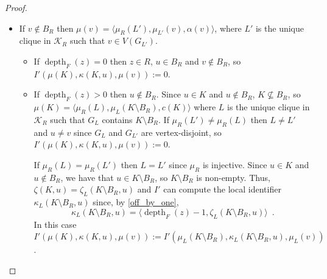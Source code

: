 \documentclass[twoside,leqno]{article}
\providecommand{\qedhere}{}
\let\eqref\cref
\DeclareMathOperator{\depth}{depth}
\begin{document}
\begin{proof}
\begin{itemize}
\begin{itemize}
      \item If $\depth_F(z)=0$ then $z\in R$ and $u\in B_R$.   There are now two possibilities that $I'$ can distinguish by looking at the number of parts of $\mu(K)$.
      \begin{itemize}
        \item If $\mu(K)$ has one part then $K\subseteq B_R$,  $\mu(K)=\langle \mu_R(K)\rangle$, and $\zeta(K,u)=\kappa_R(K,u)$.  Therefore, $I'(\mu(K),\kappa(K,u),\mu(v)):=I(\mu_R(K),\kappa_R(K,u),\mu_R(v))$.
        \item If $\mu(K)$ has three parts, then $K\not\subseteq B_R$, $\mu(K)=\langle \mu_R(L),\mu_L(K\setminus B_R),c(K)\rangle$, and  $\zeta(K,u)=\kappa_R(L,u)$, where $L$ is the unique clique in $\mathcal{K}_R$ such that $G_L$ contains $K\setminus B_R$.  Then $K\cap B_R=K\cap L$, so $u\in L$. Therefore, $I'(\mu(K),\kappa(K,u),\mu(v)):=I(\mu_R(L),\kappa_R(L,u),\mu_R(v))$.
      \end{itemize}
    \end{itemize}
    \item If $v\not\in B_R$ then $\mu(v)=\langle \mu_R(L'),\mu_{L'}(v),\alpha(v)\rangle$, where $L'$ is the unique clique in $\mathcal{K}_R$ such that $v\in V(G_{L'})$.
    \begin{itemize}
      \item If $\depth_F(z)=0$ then $z\in R$, $u\in B_R$ and $v\not\in B_R$, so $I'(\mu(K),\kappa(K,u),\mu(v)):=0$.

      \item If $\depth_F(z)>0$ then $u\not\in B_R$.  Since $u\in K$ and $u\not\in B_R$, $K\not\subseteq B_R$, so $\mu(K)=\langle \mu_R(L),\mu_{L}(K\setminus B_R),c(K)\rangle$ where $L$ is the unique clique in $\mathcal{K}_R$ such that $G_L$ contains $K\setminus B_R$.  If $\mu_R(L')\neq \mu_R(L)$ then $L\neq L'$ and $u\neq v$ since $G_{L}$ and $G_{L'}$ are vertex-disjoint, so $I'(\mu(K),\kappa(K,u),\mu(v)):=0$.

      If $\mu_R(L)=\mu_R(L')$ then $L=L'$ since $\mu_R$ is injective.
      Since $u\in K$ and $u\not\in B_R$, we have that $u\in K\setminus B_R$, so $K\setminus B_R$ is non-empty. Thus, $\zeta(K,u)=\zeta_L(K\setminus B_R,u)$
      and $I'$ can compute the local identifier $\kappa_L(K\setminus B_R,u)$ since, by \eqref{off_by_one},
      \[
        \kappa_L(K\setminus B_R,u) = \langle \depth_F(z)-1, \zeta_L(K\setminus B_R,u)\rangle\enspace.
      \]
      In this case $I'(\mu(K),\kappa(K,u),\mu(v)):=I'(\mu_L(K\setminus B_R),\kappa_L(K\setminus B_R,u),\mu_L(v))$. \qedhere
    \end{itemize}
  \end{itemize}
\end{proof}
\end{document}
